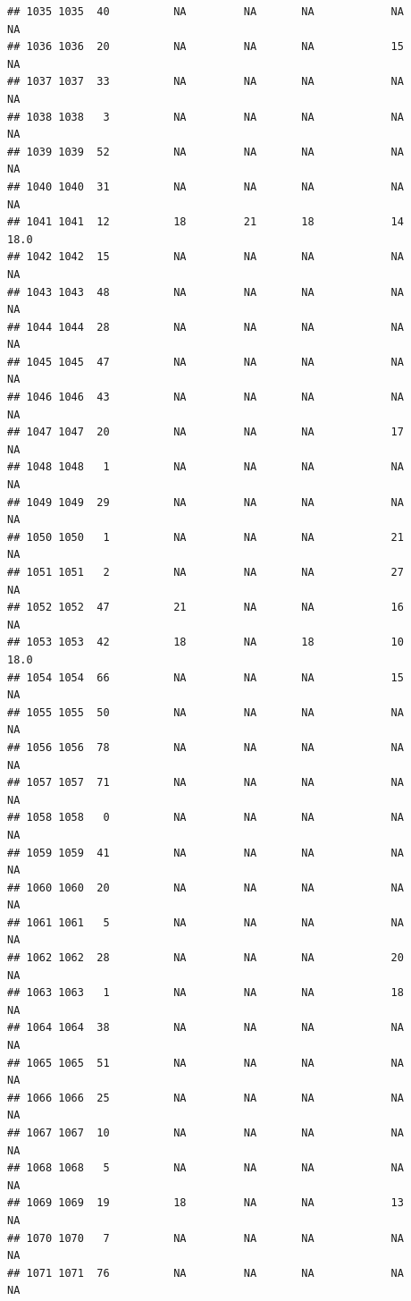 \documentclass[man]{apa6}
\begin{document}
\begin{verbatim}
## 1035 1035  40          NA         NA       NA            NA       NA
## 1036 1036  20          NA         NA       NA            15       NA
## 1037 1037  33          NA         NA       NA            NA       NA
## 1038 1038   3          NA         NA       NA            NA       NA
## 1039 1039  52          NA         NA       NA            NA       NA
## 1040 1040  31          NA         NA       NA            NA       NA
## 1041 1041  12          18         21       18            14     18.0
## 1042 1042  15          NA         NA       NA            NA       NA
## 1043 1043  48          NA         NA       NA            NA       NA
## 1044 1044  28          NA         NA       NA            NA       NA
## 1045 1045  47          NA         NA       NA            NA       NA
## 1046 1046  43          NA         NA       NA            NA       NA
## 1047 1047  20          NA         NA       NA            17       NA
## 1048 1048   1          NA         NA       NA            NA       NA
## 1049 1049  29          NA         NA       NA            NA       NA
## 1050 1050   1          NA         NA       NA            21       NA
## 1051 1051   2          NA         NA       NA            27       NA
## 1052 1052  47          21         NA       NA            16       NA
## 1053 1053  42          18         NA       18            10     18.0
## 1054 1054  66          NA         NA       NA            15       NA
## 1055 1055  50          NA         NA       NA            NA       NA
## 1056 1056  78          NA         NA       NA            NA       NA
## 1057 1057  71          NA         NA       NA            NA       NA
## 1058 1058   0          NA         NA       NA            NA       NA
## 1059 1059  41          NA         NA       NA            NA       NA
## 1060 1060  20          NA         NA       NA            NA       NA
## 1061 1061   5          NA         NA       NA            NA       NA
## 1062 1062  28          NA         NA       NA            20       NA
## 1063 1063   1          NA         NA       NA            18       NA
## 1064 1064  38          NA         NA       NA            NA       NA
## 1065 1065  51          NA         NA       NA            NA       NA
## 1066 1066  25          NA         NA       NA            NA       NA
## 1067 1067  10          NA         NA       NA            NA       NA
## 1068 1068   5          NA         NA       NA            NA       NA
## 1069 1069  19          18         NA       NA            13       NA
## 1070 1070   7          NA         NA       NA            NA       NA
## 1071 1071  76          NA         NA       NA            NA       NA

\end{verbatim}
\end{document}
